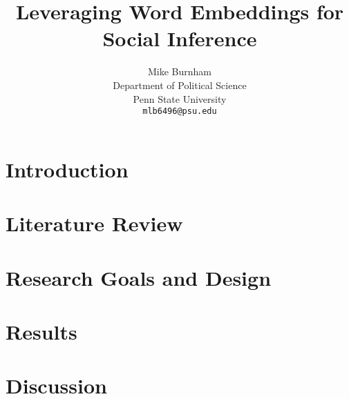 \documentclass{article}
\title{Leveraging Word Embeddings for Social Inference}
\author{
  Mike Burnham \\
  Department of Political Science\\
  Penn State University\\
  \texttt{mlb6496@psu.edu} \\
}
\begin{document}
\maketitle

\begin{abstract}

\end{abstract}



\section{Introduction}



\section{Literature Review}
\label{sec:litreview}



\section{Research Goals and Design}
\label{sec:design}


\section{Results}
\label{sec:results}


\section{Discussion}
\label{sec:discussion}



  



\appendix

\end{document}
